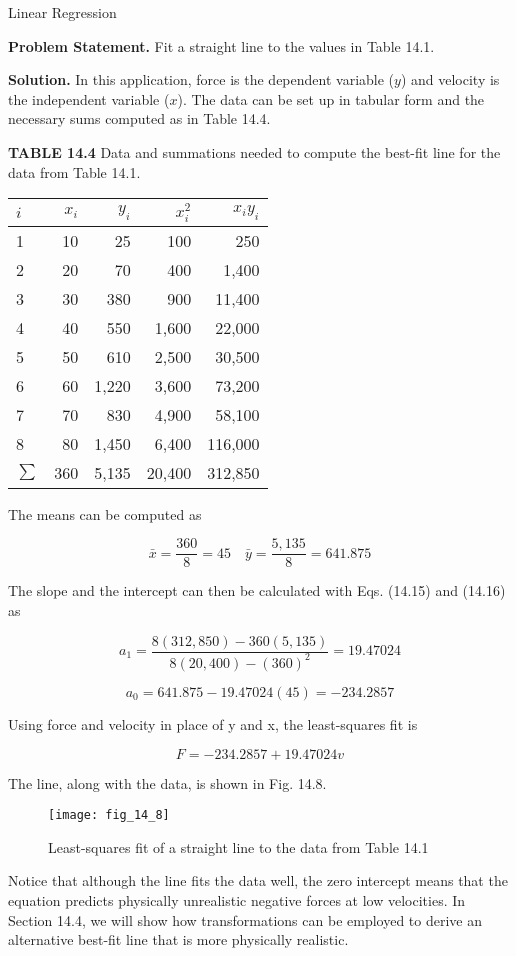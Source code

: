 \documentclass[../main.tex]{subfiles}
\begin{document}
\begin{example} Linear Regression
	
	\noindent \textbf{Problem Statement. } \quad  Fit a straight line to the values in Table 14.1.

	\noindent \textbf{Solution. } \quad   In this application, force is the dependent variable ($y$) and velocity is the
	independent variable ($x$). The data can be set up in tabular form and the necessary sums
	computed as in Table 14.4.

	\noindent \textbf{TABLE 14.4} \quad Data and summations needed to compute the best-fit line for the data
	from Table 14.1.

	\begin{tabular}{lrrrr}
		$i$ & $x_i$ & $y_i$ & $x^2_i$ & $x_i y_i$ \\
		\hline
		1 & 10 & 25 & 100 & 250 \\
		2 & 20 & 70 & 400 & 1,400 \\
		3 & 30 & 380 & 900 & 11,400 \\
		4 & 40 & 550 & 1,600 & 22,000 \\
		5 & 50 & 610 & 2,500 & 30,500 \\
		6 & 60 & 1,220 & 3,600 & 73,200 \\
		7 & 70 & 830 & 4,900 & 58,100 \\
		8 & 80 & 1,450 & 6,400 & 116,000 \\
		$\sum$ &360 & 5,135 & 20,400 & 312,850
	\end{tabular}

	The means can be computed as

	$$
		\bar{x} = \frac{360}{8} = 45 \quad \bar{y} = \frac{5,135}{8 } = 641.875
	$$

	\noindent The slope and the intercept can then be calculated with Eqs. (14.15) and (14.16) as

	$$
		a_1 = \frac{8(312,850) - 360(5,135)}{8(20,400) - (360)^2} = 19.47024
	$$

	$$
		a_0 = 641.875 - 19.47024(45) = -234.2857
	$$

	\noindent Using force and velocity in place of y and x, the least-squares fit is

	$$
	F = -234.2857 + 19.47024v
	$$

	\noindent The line, along with the data, is shown in Fig. 14.8.

	\begin{figure}[H]
		\centering
		\texttt{[image: fig\_14\_8]}
		\caption{\textsf{Least-squares fit of a straight line to the data from Table 14.1}}
		\label{fig:fig_14_8}
	\end{figure}

	Notice that although the line fits the data well, the zero intercept means that the equation predicts physically unrealistic negative forces at low velocities. In Section 14.4, we
will show how transformations can be employed to derive an alternative best-fit line that is
more physically realistic.

\end{example}
\end{document}

